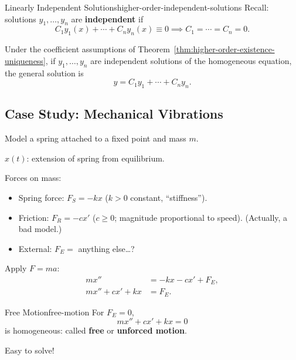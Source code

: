 \begin{definition}{Linearly Independent Solutions}{higher-order-independent-solutions}
  Recall: solutions $y_1,\ldots,y_n$ are \textbf{independent} if
  \[
    C_1y_1(x)+\cdots+C_ny_n(x)\equiv0
    \implies C_1=\cdots=C_n=0.
  \]
\end{definition}

Under the coefficient assumptions of Theorem~\ref{thm:higher-order-existence-uniqueness},
if $y_1,\ldots,y_n$ are independent solutions of the homogeneous equation, the general solution is
\[
  y=C_1y_1+\cdots+C_ny_n.
\]

\subsection{Case Study: Mechanical Vibrations}

Model a spring attached to a fixed point and mass $m$.
\begin{center}
\end{center}
$x(t)$: extension of spring from equilibrium.

Forces on mass:
\begin{itemize}
  \item Spring force: $F_S=-kx$ ($k>0$ constant, ``stiffness'').
  \item Friction: $F_R=-cx'$ ($c\ge0$; magnitude proportional to speed).
        (Actually, a bad model.)
  \item External: $F_E=$ anything else\ldots?
\end{itemize}
Apply $F=ma$:
\begin{align*}
  mx''        & =-kx-cx'+F_E, \\
  mx''+cx'+kx & =F_E.
\end{align*}

\begin{definition}{Free Motion}{free-motion}
  For $F_E=0$,
  \[
    mx''+cx'+kx=0
  \]
  is homogeneous: called \textbf{free} or \textbf{unforced motion}.
\end{definition}
Easy to solve!

